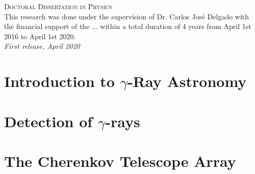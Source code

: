 \documentclass[12pt,fleqn,aas_macros]{book} %
\begin{document}
\noindent \textsc{Doctoral Dissertation in Physics}\\

\noindent This research was done under the supervision of Dr. Carlos José Delgado with the financial support of the ... within a total duration of 4 years from April 1st 2016 to April 1st 2020.\\ %

\noindent \textit{First release, April 2020} %
\fi


\pagestyle{empty} %

\tableofcontents %


\pagestyle{fancy} %



\chapter{Introduction to $\gamma$-Ray Astronomy}



\chapter{Detection of $\gamma$-rays}


\chapter{The Cherenkov Telescope Array} \label{cap:CTA}


\printbibliography
\printglossaries
\end{document}
